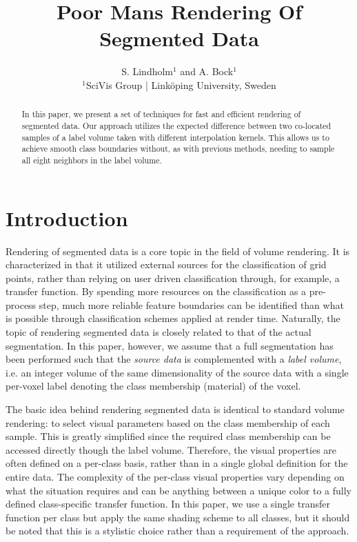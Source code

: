 \documentclass{egpubl}
\title[PMS]%
      {Poor Mans Rendering Of Segmented Data}
\author[S. Lindholm \& A. Bock]
       {S. Lindholm$^{1}$
        and A. Bock$^{1}$
        \\
         $^1$SciVis Group | Link\"{o}ping University, Sweden
       }
\begin{document}

\maketitle

\begin{abstract}
In this paper, we present a set of techniques for fast and efficient rendering of segmented data. Our approach utilizes the expected difference between two co-located samples of a label volume taken with different interpolation kernels. This allows us to achieve smooth class boundaries without, as with previous methods, needing to sample all eight neighbors in the label volume. 

\begin{classification} %
\end{classification}

\end{abstract}





\section{Introduction}

Rendering of segmented data is a core topic in the field of volume rendering. It is characterized in that it utilized external sources for the classification of grid points, rather than relying on user driven classification through, for example, a transfer function. By spending more resources on the classification as a pre-process step, much more reliable feature boundaries can be identified than what is possible through classification schemes applied at render time. Naturally, the topic of rendering segmented data is closely related to that of the actual segmentation. In this paper, however, we assume that a full segmentation has been performed such that the \emph{source data} is complemented with a \emph{label volume}, i.e. an integer volume of the same dimensionality of the source data with a single per-voxel label denoting the class membership (material) of the voxel.

The basic idea behind rendering segmented data is identical to standard volume rendering: to select visual parameters based on the class membership of each sample. This is greatly simplified since the required class membership can be accessed directly though the label volume. Therefore, the visual properties are often defined on a per-class basis, rather than in a single global definition for the entire data. The complexity of the per-class visual properties vary depending on what the situation requires and can be anything between a unique color to a fully defined class-specific transfer function. In this paper, we use a single transfer function per class but apply the same shading scheme to all classes, but it should be noted that this is a stylistic choice rather than a requirement of the approach.
\end{document}
